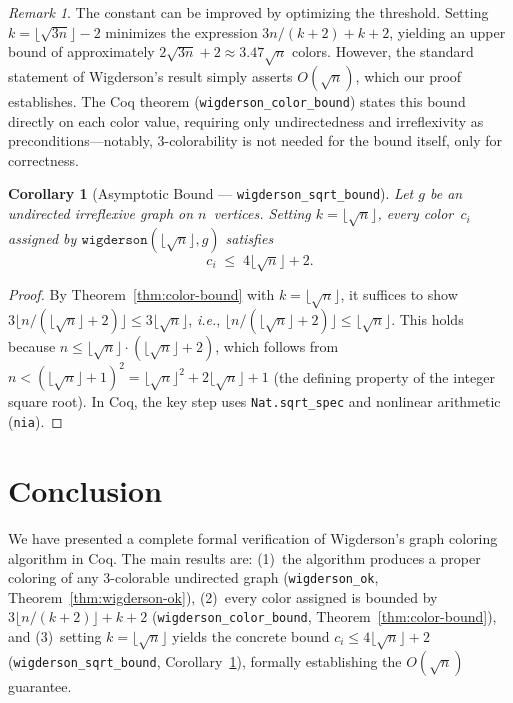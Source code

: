 \documentclass[11pt]{article}
\theoremstyle{plain}
\newtheorem{corollary}[theorem]{Corollary}
\theoremstyle{definition}
\theoremstyle{remark}
\newtheorem{remark}[theorem]{Remark}
\newcommand{\ie}{\textit{i.e.}}
\begin{document}
\begin{remark}
The constant can be improved by optimizing the threshold.
Setting $k = \lfloor\!\sqrt{3n}\rfloor - 2$ minimizes the expression
$3n/(k{+}2) + k + 2$, yielding an upper bound of approximately
$2\sqrt{3n} + 2 \approx 3.47\sqrt{n}$ colors.
However, the standard statement of Wigderson's result simply asserts
$O(\!\sqrt{n})$, which our proof establishes.
The Coq theorem (\texttt{wigderson\_color\_bound}) states this bound
directly on each color value, requiring only undirectedness and
irreflexivity as preconditions---notably, 3-colorability is not needed
for the bound itself, only for correctness.
\end{remark}

\begin{corollary}[Asymptotic Bound --- \texttt{wigderson\_sqrt\_bound}]
\label{cor:sqrt-bound}
Let $g$ be an undirected irreflexive graph on $n$~vertices.
Setting $k = \lfloor\!\sqrt{n}\rfloor$, every color~$c_i$ assigned by
$\texttt{wigderson}(\lfloor\!\sqrt{n}\rfloor, g)$ satisfies
\[
  c_i \;\le\; 4\lfloor\!\sqrt{n}\rfloor + 2.
\]
\end{corollary}

\begin{proof}
By Theorem~\ref{thm:color-bound} with $k = \lfloor\!\sqrt{n}\rfloor$,
it suffices to show $3\lfloor n/(\lfloor\!\sqrt{n}\rfloor + 2)\rfloor \le 3\lfloor\!\sqrt{n}\rfloor$,
\ie, $\lfloor n/(\lfloor\!\sqrt{n}\rfloor + 2)\rfloor \le \lfloor\!\sqrt{n}\rfloor$.
This holds because $n \le \lfloor\!\sqrt{n}\rfloor \cdot (\lfloor\!\sqrt{n}\rfloor + 2)$,
which follows from $n < (\lfloor\!\sqrt{n}\rfloor + 1)^2 = \lfloor\!\sqrt{n}\rfloor^2 + 2\lfloor\!\sqrt{n}\rfloor + 1$
(the defining property of the integer square root).
In Coq, the key step uses \texttt{Nat.sqrt\_spec} and nonlinear arithmetic (\texttt{nia}).
\end{proof}

\section{Conclusion}
\label{sec:conclusion}

We have presented a complete formal verification of Wigderson's graph coloring algorithm in Coq. The main results are: (1)~the algorithm produces a proper coloring of any 3-colorable undirected graph (\texttt{wigderson\_ok}, Theorem~\ref{thm:wigderson-ok}), (2)~every color assigned is bounded by $3\lfloor n/(k{+}2)\rfloor + k + 2$ (\texttt{wigderson\_color\_bound}, Theorem~\ref{thm:color-bound}), and (3)~setting $k = \lfloor\!\sqrt{n}\rfloor$ yields the concrete bound $c_i \le 4\lfloor\!\sqrt{n}\rfloor + 2$ (\texttt{wigderson\_sqrt\_bound}, Corollary~\ref{cor:sqrt-bound}), formally establishing the $O(\!\sqrt{n})$ guarantee.
\end{document}
